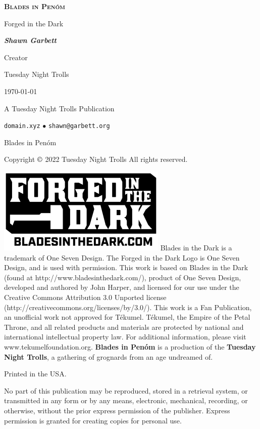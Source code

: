 \begin{titlepage}
	
	\centering
	
	\vspace*{2.5cm}
	{\scshape\Huge\bfseries Blades in Penóm\par}
	\vspace{1cm}
	{\Large Forged in the Dark\par}
	\vspace{2cm}
	{\Large\bfseries\itshape Shawn Garbett\par}
	{Creator\par}
	
	\vfill Tuesday Night Trolls \vfill

	{\large \today\par}
\end{titlepage}



{\centering
A Tuesday Night Trolls Publication\par
\texttt{domain.xyz} $\bullet$ \texttt{shawn@garbett.org}\par
\vfill
Blades in Penóm\par
Copyright $\copyright$ 2022 Tuesday Night Trolls
All rights reserved.\par
\vfill
\includegraphics[scale=0.5]{img/forged_in_the_dark_logo2_0.png}
\vfill
Blades in the Dark\texttrademark{} is a trademark of One Seven Design. The Forged in the Dark Logo is \textcopyright{} One Seven Design, and is used with permission.
\vfill
This work is based on Blades in the Dark (found at http://www.bladesinthedark.com/), product of One Seven Design, developed and authored by John Harper, and licensed for our use under the Creative Commons Attribution 3.0 Unported license (http://creativecommons.org/licenses/by/3.0/).
\vfill
This work is a Fan Publication, an unofficial work not approved for Tékumel. Tékumel, the Empire of the Petal Throne, and all related products and materials are protected by national and international intellectual property law. For additional information, please visit www.tekumelfoundation.org.
\vfill
\textbf{Blades in Penóm} is a production of the \textbf{Tuesday Night Trolls}, a gathering of grognards from an age undreamed of.\par 
\vfill
Printed in the USA.\par
\vfill
No part of this publication may be reproduced, stored in a retrieval
system, or transmitted in any form or by any means, electronic, mechanical, recording, or otherwise, without the prior express permission
of the publisher. Express permission is granted for creating copies for
personal use.\par
}
